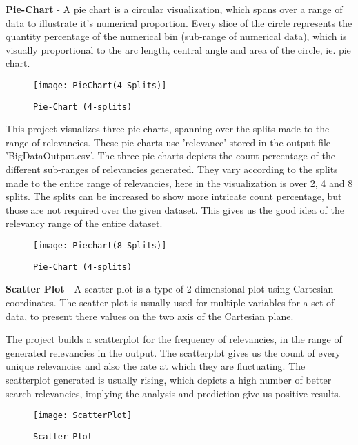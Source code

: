\documentclass{sig-alternate-05-2015}
\begin{document}
\textbf{Pie-Chart} - A pie chart is a circular visualization, which spans over a range of data to illustrate it's numerical proportion. Every slice of the circle represents the quantity percentage of the numerical bin (sub-range of numerical data), which is visually proportional to the arc length, central angle and area of the circle, ie. pie chart.\cite{www-wikiPie}

\begin{figure}
\centering
\texttt{[image: PieChart(4-Splits)]}
\caption{\texttt{Pie-Chart (4-splits)}}
\end{figure}

This project visualizes three pie charts, spanning over the splits made to the range of relevancies. These pie charts use 'relevance' stored in the output file 'BigDataOutput.csv'. The three pie charts depicts the count percentage of the different sub-ranges of relevancies generated. They vary according to the splits made to the entire range of relevancies, here in the visualization is over 2, 4 and 8 splits. The splits can be increased to show more intricate count percentage, but those are not required over the given dataset. This gives us the good idea of the relevancy range of the entire dataset.\\


\begin{figure}
\centering
\texttt{[image: Piechart(8-Splits)]}
\caption{\texttt{Pie-Chart (4-splits)}}
\end{figure}


\textbf{Scatter Plot} - A scatter plot is a type of 2-dimensional plot using Cartesian coordinates. The scatter plot is usually used for multiple variables for a set of data, to present there values on the two axis of the Cartesian plane. \cite{www-wikiScatter}


The project builds a scatterplot for the frequency of relevancies, in the range of generated relevancies in the output. The scatterplot gives us the count of every unique relevancies and also the rate at which they are fluctuating. The scatterplot generated is usually rising, which depicts a high number of better search relevancies, implying the analysis and prediction give us positive results.


\begin{figure}
\centering
\texttt{[image: ScatterPlot]}
\caption{\texttt{Scatter-Plot}}
\end{figure}
\end{document}

